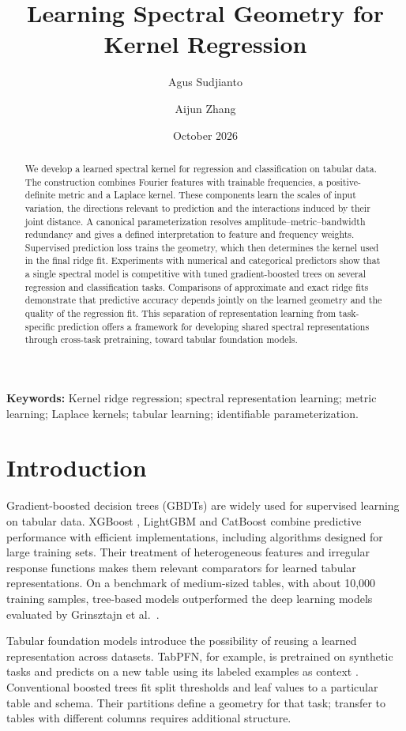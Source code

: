 \documentclass[11pt]{article}
\title{Learning Spectral Geometry for Kernel Regression}
\author{Agus Sudjianto \and Aijun Zhang}
\date{October 2026}
\begin{document}
\maketitle
\begin{abstract}
We develop a learned spectral kernel for regression and classification on tabular data. The construction combines Fourier features with trainable frequencies, a positive-definite metric and a Laplace kernel. These components learn the scales of input variation, the directions relevant to prediction and the interactions induced by their joint distance. A canonical parameterization resolves amplitude--metric--bandwidth redundancy and gives a defined interpretation to feature and frequency weights. Supervised prediction loss trains the geometry, which then determines the kernel used in the final ridge fit. Experiments with numerical and categorical predictors show that a single spectral model is competitive with tuned gradient-boosted trees on several regression and classification tasks. Comparisons of approximate and exact ridge fits demonstrate that predictive accuracy depends jointly on the learned geometry and the quality of the regression fit. This separation of representation learning from task-specific prediction offers a framework for developing shared spectral representations through cross-task pretraining, toward tabular foundation models.
\end{abstract}
\noindent\textbf{Keywords:} Kernel ridge regression; spectral representation learning; metric learning; Laplace kernels; tabular learning; identifiable parameterization.
\par\medskip

\section{Introduction}
Gradient-boosted decision trees (GBDTs) are widely used for supervised learning on tabular data. XGBoost \cite{chen2016}, LightGBM \cite{ke2017} and CatBoost \cite{prokhorenkova2018} combine predictive performance with efficient implementations, including algorithms designed for large training sets. Their treatment of heterogeneous features and irregular response functions makes them relevant comparators for learned tabular representations. On a benchmark of medium-sized tables, with about 10,000 training samples, tree-based models outperformed the deep learning models evaluated by Grinsztajn et al.\ \cite{grinsztajn2022}.

Tabular foundation models introduce the possibility of reusing a learned representation across datasets. TabPFN, for example, is pretrained on synthetic tasks and predicts on a new table using its labeled examples as context \cite{hollmann2025}. Conventional boosted trees fit split thresholds and leaf values to a particular table and schema. Their partitions define a geometry for that task; transfer to tables with different columns requires additional structure.
\end{document}
